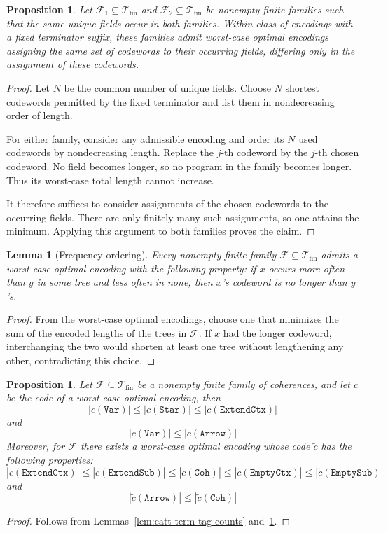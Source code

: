 \documentclass{article}%
\newtheorem{proposition}[theorem]{Proposition}
\newtheorem{lemma}[theorem]{Lemma}
\theoremstyle{remark}
\theoremstyle{definition}
\theoremstyle{definition}
\theoremstyle{plain}
\begin{document}
\begin{proposition}
Let \(\mathcal F_1\subseteq\mathcal{T}_\text{fin}\) and \(\mathcal
F_2\subseteq\mathcal{T}_\text{fin}\) be nonempty finite families such that the same
unique fields occur in both families. Within class of encodings with a fixed
terminator suffix, these families admit worst-case optimal encodings assigning
the same set of codewords to their occurring fields, differing only in the
assignment of these codewords.
\end{proposition}
\begin{proof}
Let \(N\) be the common number of unique fields. Choose \(N\) shortest codewords
permitted by the fixed terminator and list them in nondecreasing order of
length.

For either family, consider any admissible encoding and order its \(N\) used
codewords by nondecreasing length. Replace the \(j\)-th codeword by the \(j\)-th
chosen codeword. No field becomes longer, so no program in the family becomes
longer. Thus its worst-case total length cannot increase.

It therefore suffices to consider assignments of the chosen codewords to the
occurring fields. There are only finitely many such assignments, so one attains
the minimum. Applying this argument to both families proves the claim.
\end{proof}

\begin{lemma}[Frequency ordering]
\label{lem:frequency-ordering}
Every nonempty finite family \(\mathcal
F\subseteq\mathcal{T}_\text{fin}\) admits a worst-case optimal encoding with the following
property: if \(x\) occurs more often than \(y\) in some tree and less often in
none, then \(x\)'s codeword is no longer than \(y\)'s.
\end{lemma}
\begin{proof}
From the worst-case optimal encodings, choose one that minimizes the sum of the
encoded lengths of the trees in \(\mathcal F\). If \(x\) had the longer
codeword, interchanging the two would shorten at least one tree without
lengthening any other, contradicting this choice.
\end{proof}

\begin{proposition}
Let \(\mathcal F\subseteq\mathcal{T}_\text{fin}\) be a nonempty finite family of coherences,
and let \(c\) be the code of a worst-case optimal encoding, then
\[
  |c(\mathtt{Var})| \leq |c(\mathtt{Star})| \leq |c(\mathtt{ExtendCtx})|
\]
and
\[
  |c(\mathtt{Var})| \leq |c(\mathtt{Arrow})|
\]
Moreover, for \(\mathcal F\) there exists a worst-case optimal encoding whose
code \(\tilde{c}\) has the following properties:
\[
  |\tilde{c}(\mathtt{ExtendCtx})|  \leq |\tilde{c}(\mathtt{ExtendSub})| \leq 
  |\tilde{c}(\mathtt{Coh})| \leq |\tilde{c}(\mathtt{EmptyCtx})| \leq 
  |\tilde{c}(\mathtt{EmptySub})|
\]
and
\[
  |\tilde{c}(\mathtt{Arrow})| \leq |\tilde{c}(\mathtt{Coh})|
\]
\end{proposition}
\begin{proof}
Follows from Lemmas~\ref{lem:catt-term-tag-counts}
and~\ref{lem:frequency-ordering}.  %
\end{proof}
\end{document}
